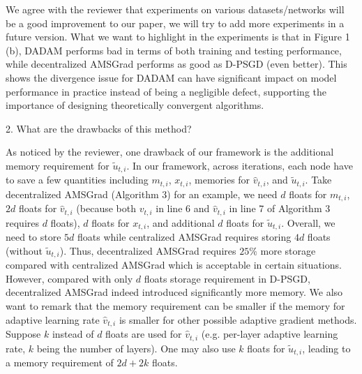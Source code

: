 \documentclass{article} %
\begin{document}
We agree with the reviewer that experiments on various datasets/networks will be a good improvement to our paper, we will try to add more experiments in a future version. What we want to highlight in the experiments is that in Figure 1 (b), DADAM performs bad in terms of both training and testing performance, while decentralized AMSGrad performs as good as D-PSGD (even better). This shows the divergence issue for DADAM can have significant impact on model performance in practice instead of being a negligible defect, supporting the importance of designing theoretically convergent algorithms. 

2. What are the drawbacks of this method?

As noticed by the reviewer, one drawback of our framework is the additional memory requirement for $\tilde{u}_{t,i}$. In our framework, across iterations, each node have to save a few quantities including $m_{t,i}$, $x_{t,i}$, memories for $\hat v_{t,i}$, and $\tilde{u}_{t,i}$. Take decentralized AMSGrad (Algorithm 3) for an example, we  need $d$ floats for  $m_{t,i}$, $2d$ floats for $\hat v_{t,i}$ (because both $v_{t,i}$ in line 6 and $\hat v_{t,i}$ in line 7 of Algorithm 3 requires $d$ floats), $d$ floats for $x_{t,i}$, and additional $d$ floats for $\tilde u_{t,i}$. Overall, we need to store $5d$ floats while centralized AMSGrad requires storing $4d$ floats (without $\tilde u_{t,i}$).  Thus, decentralized AMSGrad requires $25\%$ more storage compared with centralized AMSGrad which is acceptable in certain situations. However, compared with only $d$ floats storage requirement in D-PSGD, decentralized AMSGrad indeed introduced significantly more memory.  We also want to remark that the memory requirement can be smaller if the memory for adaptive learning rate $\hat v_{t,i}$ is smaller for other possible adaptive gradient methods. Suppose $k$ instead of $d$ floats are used for $\hat v_{t,i}$ (e.g. per-layer adaptive learning rate, $k$ being the number of layers). One may also use $k$ floats for $\tilde u_{t,i}$, leading to a memory requirement of $2d+2k$ floats. 
\end{document}
